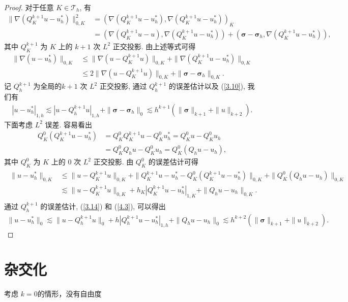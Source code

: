 	\begin{proof}
		对于任意 $K\in\mathcal{T}_h$, 有
		\begin{align*}
			\|\nabla(Q^{k+1}_K u-u^\ast_h)\|^2_{0,K}&=(\nabla(Q^{k+1}_K u-u^\ast_h),\nabla(Q^{k+1}_K u-u^\ast_h))_K\\
			&=(\nabla(Q^{k+1}_K u-u),\nabla(Q^{k+1}_K u-u^\ast_h))+(\boldsymbol\sigma-\boldsymbol\sigma_h,\nabla(Q^{k+1}_K u-u^\ast_h)),
		\end{align*}
		其中 $Q^{k+1}_K$ 为 $K$ 上的 $k+1$ 次 $L^2$ 正交投影. 由上述等式可得
		\begin{align*}
			\|\nabla(u-u^\ast_h)\|_{0,K}&\leq\|\nabla(u-Q^{k+1}_K u)\|_{0,K}+\|\nabla(Q^{k+1}_K u-u^\ast_h)\|_{0,K}\\
			&\leq 2\|\nabla(u-Q^{k+1}_K u)\|_{0,K}+\|\boldsymbol\sigma-\boldsymbol\sigma_h\|_{0,K}.
		\end{align*}
		记 $Q^{k+1}_h$ 为全局的$k+1$ 次 $L^2$ 正交投影, 通过 $Q^{k+1}_h$ 的误差估计以及 (\ref{3.10}), 我们有
		\begin{align}
			\label{4.3}
			|u-u^\ast_h|_{1,h}\lesssim|u-Q^{k+1}_h u|_{1,h}+\|\boldsymbol\sigma-\boldsymbol\sigma_h\|_0\lesssim h^{k+1}(\|\boldsymbol\sigma\|_{k+1}+\|u\|_{k+2}).
		\end{align}
		下面考虑 $L^2$ 误差. 容易看出
		\begin{align*}
			Q^0_K(Q^{k+1}_K u-u^\ast_h)&=Q^0_KQ^{k+1}_K u-Q^0_K u^\ast_h=Q^0_K u-Q^0_K u_h\\
			&=Q^0_K Q_h u-Q^0_K u_h=Q^0_K(Q_h u-u_h),
		\end{align*}
		其中 $Q^0_K$ 为 $K$ 上的 $0$ 次 $L^2$ 正交投影. 由 $Q^0_K$ 的误差估计可得
		\begin{align}\begin{split}
			\label{4.4}
			\|u-u^\ast_h\|_{0,K}&\leq \|u-Q^{k+1}_K u\|_{0,K}+\|Q^{k+1}_K u-u^\ast_h-Q^0_K(Q^{k+1}_K u-u^\ast_h)\|_{0,K}+\|Q^0_K(Q_h u-u_h)\|_{0,K}\\
			&\lesssim\|u-Q^{k+1}_K u\|_{0,K}+h_K|Q^{k+1}_K u-u^\ast_h|_{1,K}+\|Q_h u-u_h\|_{0,K}.
			\end{split}
		\end{align}
		通过 $Q^{k+1}_h$ 的误差估计, (\ref{3.14}) 和 (\ref{4.3}), 可以得出
		\begin{align*}
			\|u-u^\ast_h\|_0\lesssim\|u-Q^{k+1}_h u\|_0+h|Q^{k+1}_h u-u^\ast_h|_{1,h}+\|Q_h u-u_h\|_0\lesssim h^{k+2}(\|\boldsymbol\sigma\|_{k+1}+\|u\|_{k+2}).
		\end{align*}
	\end{proof}

\section{杂交化}
考虑 $k=0$的情形，没有自由度
